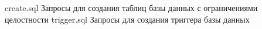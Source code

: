 \begin{appendices}
\chapter{}
	{create.sql}
	{Запросы для создания таблиц базы данных с ограничениями целостности}
\clearpage
{}
	{trigger.sql}
	{Запросы для создания триггера базы данных}
\end{appendices}